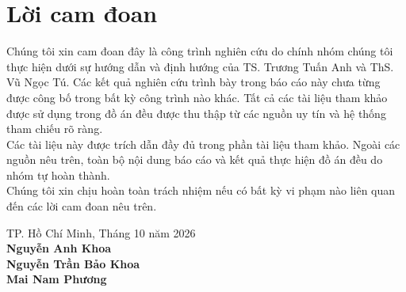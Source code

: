 \section*{Lời cam đoan}
\thispagestyle{empty}

Chúng tôi xin cam đoan đây là công trình nghiên cứu do chính nhóm chúng tôi thực hiện dưới sự hướng dẫn và định hướng của TS. Trương Tuấn Anh và ThS. Vũ Ngọc Tú. Các kết quả nghiên cứu trình bày trong báo cáo này chưa từng được công bố trong bất kỳ công trình nào khác. Tất cả các tài liệu tham khảo được sử dụng trong đồ án đều được thu thập từ các nguồn uy tín và hệ thống tham chiếu rõ ràng.\\
Các tài liệu này được trích dẫn đầy đủ trong phần tài liệu tham khảo. Ngoài các nguồn nêu trên, toàn bộ nội dung báo cáo và kết quả thực hiện đồ án đều do nhóm tự hoàn thành.\\
Chúng tôi xin chịu hoàn toàn trách nhiệm nếu có bất kỳ vi phạm nào liên quan đến các lời cam đoan nêu trên.\\

\begin{flushright}
    TP. Hồ Chí Minh, Tháng 10 năm 2026 \\
    \textbf{Nguyễn Anh Khoa} \\
    \textbf{Nguyễn Trần Bảo Khoa} \\
    \textbf{Mai Nam Phương} \\
\end{flushright}


\clearpage
{}

